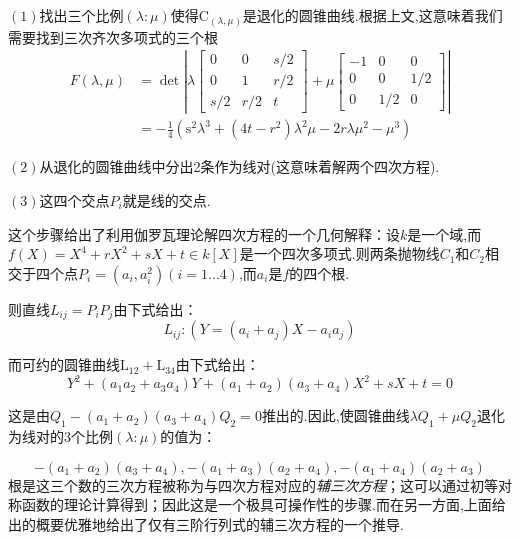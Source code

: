 \documentclass[UTF8]{book}
\begin{document}
		
		$(1)$找出三个比例$(\lambda : \mu)$使得$\mathrm{C}_{(\lambda, \mu)}$是退化的圆锥曲线.根据上文,这意味着我们需要找到三次齐次多项式的三个根
		\begin{equation*}
			\begin{aligned} F(\lambda, \mu) &=\operatorname{det}\left|\lambda\left[\begin{array}{ccc}{0} & {0} & {s / 2} \\ {0} & {1} & {r / 2} \\ {s / 2} & {r / 2} & {t}\end{array}\right]+\mu\left[\begin{array}{ccc}{-1} & {0} & {0} \\ {0} & {0} & {1 / 2} \\ {0} & {1 / 2} & {0}\end{array}\right]\right| \\ &=-\frac{1}{4}\left(\mathrm{s}^{2} \lambda^{3}+\left(4 t-r^{2}\right) \lambda^{2} \mu-2 r \lambda \mu^{2}-\mu^{3}\right) \end{aligned}
		\end{equation*}
		
		
		$(2)$从退化的圆锥曲线中分出2条作为线对(这意味着解两个四次方程).
		
		
		$(3)$这四个交点$P_{i}$就是线的交点.
		
		
		这个步骤给出了利用伽罗瓦理论解四次方程的一个几何解释：设$k$是一个域,而$f(X)=X^{4}+r X^{2}+s X+t \in k[X]$是一个四次多项式.则两条抛物线$C_{1}$和$C_{2}$相交于四个点$P_{i}=\left(a_{i}, a_{i}^{2}\right)(i = 1\ldots4)$,而$a_{i}$是$f$的四个根.
		
		
		则直线$L_{ij}=P_{i} P_{j}$由下式给出：
		\begin{equation*}
			L_{ij} :\left(Y=\left(a_{i}+a_{j}\right) X-a_{i} a_{j}\right)
		\end{equation*}
		
		而可约的圆锥曲线$\mathrm{L}_{12}+\mathrm{L}_{34}$由下式给出：
		\begin{equation*}
			Y^{2}+\left(a_{1} a_{2}+a_{3} a_{4}\right) Y+\left(a_{1}+a_{2}\right)\left(a_{3}+a_{4}\right) X^{2}+s X+t=0
		\end{equation*}
	
		这是由$Q_{1}-\left(a_{1}+a_{2}\right)\left(a_{3}+a_{4}\right) Q_{2}=0$推出的.因此,使圆锥曲线$\lambda Q_{1}+\mu Q_{2}$退化为线对的3个比例$(\lambda : \mu)$的值为：
		
		\begin{equation*}
			-\left(a_{1}+a_{2}\right)\left(a_{3}+a_{4}\right),-\left(a_{1}+a_{3}\right)\left(a_{2}+a_{4}\right),-\left(a_{1}+a_{4}\right)\left(a_{2}+a_{3}\right)
		\end{equation*}
		根是这三个数的三次方程被称为与四次方程对应的\textit{辅三次方程}；这可以通过初等对称函数的理论计算得到；因此这是一个极具可操作性的步骤.而在另一方面,上面给出的概要优雅地给出了仅有三阶行列式的辅三次方程的一个推导.
		
\end{document}
